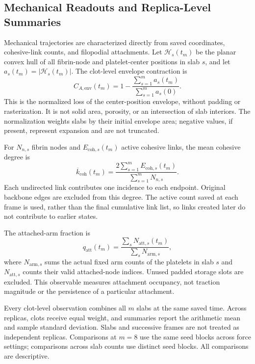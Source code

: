 \subsection{Mechanical Readouts and Replica-Level Summaries}
Mechanical trajectories are characterized directly from saved coordinates, cohesive-link counts, and filopodial attachments. Let $\mathcal H_s(t_m)$ be the planar convex hull of all fibrin-node and platelet-center positions in slab $s$, and let $a_s(t_m)=|\mathcal H_s(t_m)|$. The clot-level envelope contraction is
\begin{equation}
C_{A,\mathrm{env}}(t_m)
=1-\frac{\sum_{s=1}^{m}a_s(t_m)}{\sum_{s=1}^{m}a_s(0)}.
\label{eq:mechanics-envelope}
\end{equation}
This is the normalized loss of the center-position envelope, without padding or rasterization. It is not solid area, porosity, or an intersection of slab interiors. The normalization weights slabs by their initial envelope area; negative values, if present, represent expansion and are not truncated.

For $N_{n,s}$ fibrin nodes and $E_{\mathrm{coh},s}(t_m)$ active cohesive links, the mean cohesive degree is
\begin{equation}
\overline{k}_{\mathrm{coh}}(t_m)
=\frac{2\sum_{s=1}^{m}E_{\mathrm{coh},s}(t_m)}{\sum_{s=1}^{m}N_{n,s}}.
\label{eq:mechanics-cohesive-degree}
\end{equation}
Each undirected link contributes one incidence to each endpoint. Original backbone edges are excluded from this degree. The active count saved at each frame is used, rather than the final cumulative link list, so links created later do not contribute to earlier states.

The attached-arm fraction is
\begin{equation}
q_{\mathrm{att}}(t_m)
=\frac{\sum_s N_{\mathrm{att},s}(t_m)}{\sum_s N_{\mathrm{arm},s}},
\label{eq:mechanics-attachment}
\end{equation}
where $N_{\mathrm{arm},s}$ sums the actual fixed arm counts of the platelets in slab $s$ and $N_{\mathrm{att},s}$ counts their valid attached-node indices. Unused padded storage slots are excluded. This observable measures attachment occupancy, not traction magnitude or the persistence of a particular attachment.

Every clot-level observation combines all $m$ slabs at the same saved time. Across replicas, clots receive equal weight, and summaries report the arithmetic mean and sample standard deviation. Slabs and successive frames are not treated as independent replicas. Comparisons at $m=8$ use the same seed blocks across force settings; comparisons across slab counts use distinct seed blocks. All comparisons are descriptive.

